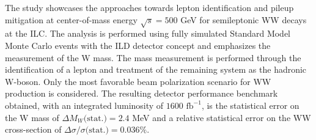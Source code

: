 %

%

 The study showcases the approaches towards lepton identification and pileup mitigation at center-of-mass energy $\sqrt{s} = 500$ GeV for semileptonic WW decays at the ILC. The analysis is performed using fully simulated Standard Model Monte Carlo events with the ILD detector concept and emphasizes the measurement of the W mass. The mass measurement is performed through the identification of a lepton and treatment of the remaining system as the hadronic W-boson. Only the most favorable beam polarization scenario for WW production is considered. The resulting detector performance benchmark obtained, with an integrated luminosity of $1600 \, \, \text{fb}^{-1}$, is the statistical error on the W mass of $\Delta M_W\text{(stat.)} =  2.4 $ MeV and a relative statistical error on the WW cross-section of $\Delta \sigma / \sigma \text{(stat.)} = 0.036\% $. 

